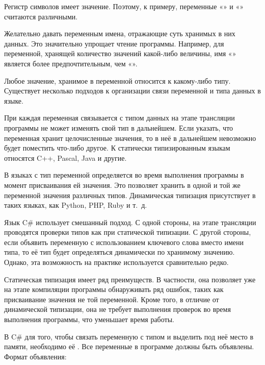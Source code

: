 Регистр символов имеет значение. Поэтому, к примеру, переменные
«» и «» считаются различными.

Желательно давать переменным имена, отражающие суть хранимых в них
данных. Это значительно упрощает чтение программы. Например, для
переменной, хранящей количество значений какой-либо величины, имя
«» является более предпочтительным, чем
«».


Любое значение, хранимое в переменной относится к какому-либо типу.
Существует несколько подходов к организации связи переменной и типа
данных в языке.

При  каждая
переменная связывается с типом данных на этапе трансляции программы не
может изменять свой тип в дальнейшем. Если указать, что переменная
хранит целочисленные значения, то в неё в дальнейшем невозможно будет
поместить что-либо другое.  К статически типизированным языкам
относятся C++, Pascal, Java и другие.

В языках с  тип
переменной определяется во время выполнения программы в момент
присваивания ей значения. Это позволяет хранить в одной и той же
переменной значения различных типов.  Динамическая типизация
присутствует в таких языках, как Python, PHP, Ruby и т.~д.

Язык C\# использует смешанный подход. С одной стороны, на этапе
трансляции проводятся проверки типов как при статической типизации. С
другой стороны, если объявить переменную с использованием ключевого
слова  вместо имени типа, то её тип будет определяться
динамически по хранимому значению. Однако, эта возможность на практике
используется сравнительно редко.

Статическая типизация имеет ряд преимуществ. В частности, она
позволяет уже на этапе компиляции программы обнаруживать ряд ошибок,
таких как присваивание значения не той переменной. Кроме того, в
отличие от динамической типизации, она не требует выполнения проверок
во время выполнения программы, что уменьшает время работы.


В C\# для того, чтобы связать переменную с типом и выделить под неё
место в памяти, необходимо её
. Все переменные в программе
должны быть объявлены. Формат объявления:

